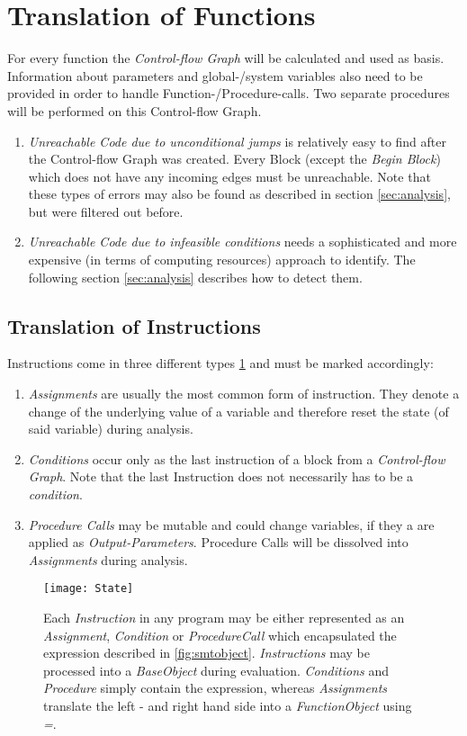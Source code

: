 \section{Translation of Functions}
\label{sec:translation}
For every function the \emph{Control-flow Graph} will be calculated and used as basis. Information about parameters and global-/system variables also need to be provided in order to handle Function-/Procedure-calls. 
Two separate procedures will be performed on this Control-flow Graph.
\begin{enumerate}
	\item \emph{Unreachable Code due to unconditional jumps} is relatively easy to find after the Control-flow Graph was created. Every Block (except the \emph{Begin Block}) which does not have any incoming edges must be unreachable.
		Note that these types of errors may also be found as described in section \ref{sec:analysis}, but were filtered out before.
	\item \emph{Unreachable Code due to infeasible conditions} needs a sophisticated and more expensive (in terms of computing resources) approach to identify. The following section \ref{sec:analysis} describes how to detect them.
\end{enumerate}
\subsection{Translation of Instructions}
Instructions come in three different types \ref{fig:state} and must be marked accordingly:
\begin{enumerate}
	\item \emph{Assignments} are usually the most common form of instruction. They denote a change of the underlying value of a variable and therefore reset the state (of said variable) during analysis. 
	\item \emph{Conditions} occur only as the last instruction of a block from a \emph{Control-flow Graph}. Note that the last Instruction does not necessarily has to be a \emph{condition}.
	\item \emph{Procedure Calls} may be mutable and could change variables, if they a are applied as \emph{Output-Parameters}. Procedure Calls will be dissolved into \emph{Assignments} during analysis.
\end{enumerate}
\begin{figure}[h!]
	\centering
	\texttt{[image: State]}
	\caption{Each \emph{Instruction} in any program may be either represented as an \emph{Assignment}, \emph{Condition} or \emph{ProcedureCall} which encapsulated the expression described in \ref{fig:smtobject}. \emph{Instructions} may be processed into a \emph{BaseObject} during evaluation. \emph{Conditions} and \emph{Procedure} simply contain the expression, whereas \emph{Assignments} translate the left - and right hand side into a \emph{FunctionObject} using \emph{=}.}
	\label{fig:state}
\end{figure}

